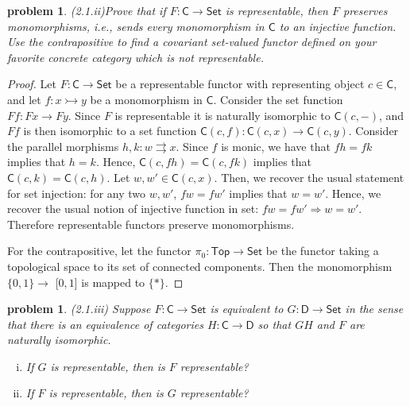\documentclass[10pt, oneside]{article}   	%
\newcommand{\cat}[1]{\mathsf{#1}}
\newcommand{\cc}{\cat{C}}
\newcommand{\dd}{\cat{D}}
\newcommand{\cset}{\cat{Set}}
\newcommand{\mono}{\rightarrowtail}
\newtheorem{problem}[theorem]{problem}
\begin{document}
\begin{problem}{(2.1.ii)}Prove that if $F : \cc \to \cset$ is representable, then $F$ preserves monomorphisms, i.e., sends every monomorphism in $\cc$ to an injective function. Use the contrapositive to find a covariant set-valued functor defined on your favorite concrete category which is not representable. 
\end{problem}

\begin{proof}
 
 Let $F : \cc \to \cset$ be a representable functor with representing object $c \in \cc$, and let $f : x \mono y$ be a monomorphism in $\cc$. Consider the set function $Ff : Fx \to Fy$. Since $F$ is representable it is naturally isomorphic to $\cc(c, -)$, and $Ff$ is then isomorphic to a set function $\cc(c,f) : \cc(c, x) \to \cc(c, y)$. Consider the parallel morphisms $h, k : w \rightrightarrows x$. Since $f$ is monic, we have that $fh = fk$ implies that $h = k$. Hence, $\cc(c, fh) = \cc(c, fk)$ implies that  $\cc(c, k) = \cc(c, h)$. Let $w, w'\in \cc(c, x)$. Then, we recover the usual statement for set injection: for any two $w, w'$, $fw = f{w'}$ implies that $w = w'$. Hence, we recover the usual notion of injective function in set: $f w = f w' \Rightarrow w = w'$. Therefore representable functors preserve monomorphisms.
 
 For the contrapositive, let the functor $\pi_0 : \cat{Top} \to \cset$ be the functor taking a topological space to its set of connected components. Then the monomorphism $\{0, 1\} \to $ [$0,1$] is mapped to $\{*\}$.
\end{proof}

\begin{problem} (2.1.iii) Suppose $F: \cc \to \cset$ is equivalent to $G: \dd \to \cset$ in the sense that there is an equivalence of categories $H: \cc \to \dd$ so that $GH$ and $F$ are naturally isomorphic. 

\begin{enumerate}[(i)]
	\item If $G$ is representable, then is $F$ representable?
	\item If $F$ is representable, then is $G$ representable?
\end{enumerate}
\end{problem}
\end{document}
